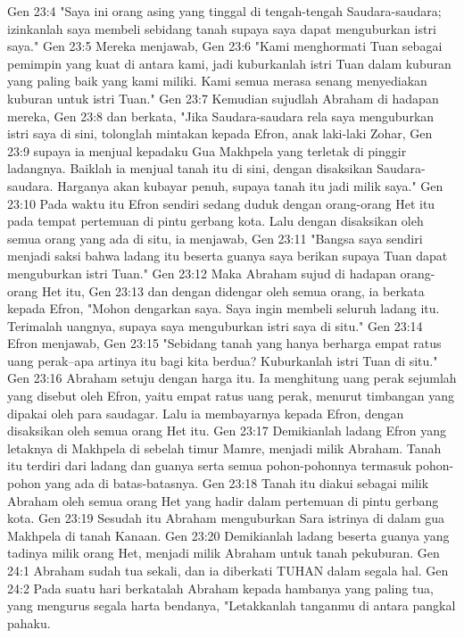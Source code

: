 Gen 23:4  "Saya ini orang asing yang tinggal di tengah-tengah Saudara-saudara; izinkanlah saya membeli sebidang tanah supaya saya dapat menguburkan istri saya."
Gen 23:5  Mereka menjawab,
Gen 23:6  "Kami menghormati Tuan sebagai pemimpin yang kuat di antara kami, jadi kuburkanlah istri Tuan dalam kuburan yang paling baik yang kami miliki. Kami semua merasa senang menyediakan kuburan untuk istri Tuan."
Gen 23:7  Kemudian sujudlah Abraham di hadapan mereka,
Gen 23:8  dan berkata, "Jika Saudara-saudara rela saya menguburkan istri saya di sini, tolonglah mintakan kepada Efron, anak laki-laki Zohar,
Gen 23:9  supaya ia menjual kepadaku Gua Makhpela yang terletak di pinggir ladangnya. Baiklah ia menjual tanah itu di sini, dengan disaksikan Saudara-saudara. Harganya akan kubayar penuh, supaya tanah itu jadi milik saya."
Gen 23:10  Pada waktu itu Efron sendiri sedang duduk dengan orang-orang Het itu pada tempat pertemuan di pintu gerbang kota. Lalu dengan disaksikan oleh semua orang yang ada di situ, ia menjawab,
Gen 23:11  "Bangsa saya sendiri menjadi saksi bahwa ladang itu beserta guanya saya berikan supaya Tuan dapat menguburkan istri Tuan."
Gen 23:12  Maka Abraham sujud di hadapan orang-orang Het itu,
Gen 23:13  dan dengan didengar oleh semua orang, ia berkata kepada Efron, "Mohon dengarkan saya. Saya ingin membeli seluruh ladang itu. Terimalah uangnya, supaya saya menguburkan istri saya di situ."
Gen 23:14  Efron menjawab,
Gen 23:15  "Sebidang tanah yang hanya berharga empat ratus uang perak--apa artinya itu bagi kita berdua? Kuburkanlah istri Tuan di situ."
Gen 23:16  Abraham setuju dengan harga itu. Ia menghitung uang perak sejumlah yang disebut oleh Efron, yaitu empat ratus uang perak, menurut timbangan yang dipakai oleh para saudagar. Lalu ia membayarnya kepada Efron, dengan disaksikan oleh semua orang Het itu.
Gen 23:17  Demikianlah ladang Efron yang letaknya di Makhpela di sebelah timur Mamre, menjadi milik Abraham. Tanah itu terdiri dari ladang dan guanya serta semua pohon-pohonnya termasuk pohon-pohon yang ada di batas-batasnya.
Gen 23:18  Tanah itu diakui sebagai milik Abraham oleh semua orang Het yang hadir dalam pertemuan di pintu gerbang kota.
Gen 23:19  Sesudah itu Abraham menguburkan Sara istrinya di dalam gua Makhpela di tanah Kanaan.
Gen 23:20  Demikianlah ladang beserta guanya yang tadinya milik orang Het, menjadi milik Abraham untuk tanah pekuburan.
Gen 24:1  Abraham sudah tua sekali, dan ia diberkati TUHAN dalam segala hal.
Gen 24:2  Pada suatu hari berkatalah Abraham kepada hambanya yang paling tua, yang mengurus segala harta bendanya, "Letakkanlah tanganmu di antara pangkal pahaku.
